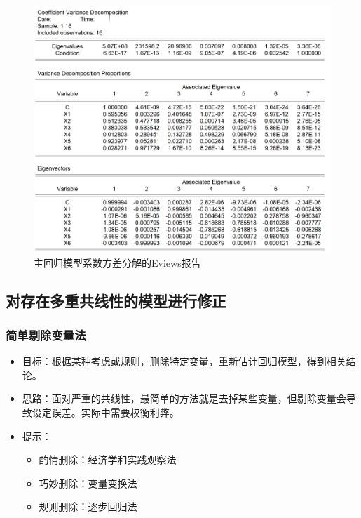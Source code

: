 \documentclass[12pt,(landscape,a4paper),(portrait,a4paper)]{article}
\providecommand{\tightlist}{%
  \setlength{\itemsep}{0pt}\setlength{\parskip}{0pt}}
\begin{document}
\begin{figure}

{\centering \includegraphics[width=8in]{picture/lab5-multilinearity/4-vcd-full-result} 

}

\caption{主回归模型系数方差分解的Eviews报告}\label{fig:fig-cvd-report}
\end{figure}

\subsection{对存在多重共线性的模型进行修正}

\subsubsection{简单剔除变量法}

\begin{itemize}
\item
  目标：根据某种考虑或规则，删除特定变量，重新估计回归模型，得到相关结论。
\item
  思路：面对严重的共线性，最简单的方法就是去掉某些变量，但剔除变量会导致设定误差。实际中需要权衡利弊。
\item
  提示：

  \begin{itemize}
  \tightlist
  \item
    酌情删除：经济学和实践观察法
  \item
    巧妙删除：变量变换法
  \item
    规则删除：逐步回归法
  \end{itemize}
\end{itemize}
\end{document}
